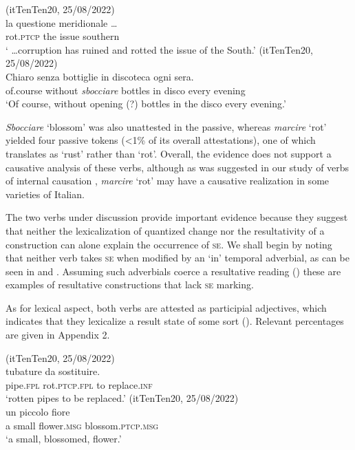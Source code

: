 \documentclass[output=paper,colorlinks,citecolor=brown
]{langscibook}
\begin{document}
\ea (itTenTen20, 25/08/2022)\label{bentley_example_16}\\
     	la			questione	meridionale \ldots   \\
    {} rot.\textsc{ptcp}		the		issue					southern \\
    \glt ‘ \ldots  corruption has ruined and rotted the issue of the South.’
\ex \label{bentley_example_17}(itTenTen20, 25/08/2022)\\
    \gll Chiaro 			senza			 bottiglie	in	discoteca		ogni		sera.  \\
 of.course		without	\textit{sbocciare}	bottles			in disco					every evening \\
    \glt ‘Of course, without opening (?) bottles in the disco every evening.’
\z

\textit{Sbocciare} ‘blossom’ was also unattested in the passive, whereas \textit{marcire} ‘rot’ yielded four passive tokens (<1\% of its overall attestations), one of which translates as ‘rust’ rather than ‘rot’. Overall, the evidence does not support a causative analysis of these verbs, although as was suggested in our study of verbs of internal causation \citep{bentley2023internally}, \textit{marcire} ‘rot’ may have a causative realization in some varieties of Italian.

The two verbs under discussion provide important evidence because they suggest that neither the lexicalization of quantized change nor the resultativity of a construction can alone explain the occurrence of \textsc{se}. We shall begin by noting that neither verb takes \textsc{se} when modified by an ‘in’ temporal adverbial, as can be seen in  and . Assuming such adverbials coerce a resultative reading (\cites[332--336]{dowty1979word}{hay1999scalar}) these are examples of resultative constructions that lack \textsc{se} marking.

As for lexical aspect, both verbs are attested as participial adjectives, which indicates that they lexicalize a result state of some sort (\cites[]{hout2004unaccusativity}[355]{bentley2006split}[283--284]{legendre2017auxiliaries}). Relevant percentages are given in Appendix 2.

\ea \label{bentley_example_18}(itTenTen20, 25/08/2022)\\
    \gll tubature							da 	sostituire.   \\
    pipe.\textsc{fpl}	rot.\textsc{ptcp}.\textsc{fpl}	to		replace.\textsc{inf}		 \\
    \glt ‘rotten pipes to be replaced.’
\ex \label{bentley_example_19}(itTenTen20, 25/08/2022)\\
    \gll un	piccolo	fiore						   \\
    a			small			flower.\textsc{msg}	blossom.\textsc{ptcp}.\textsc{msg}	 \\
    \glt ‘a small, blossomed, flower.’
\z
\end{document}

